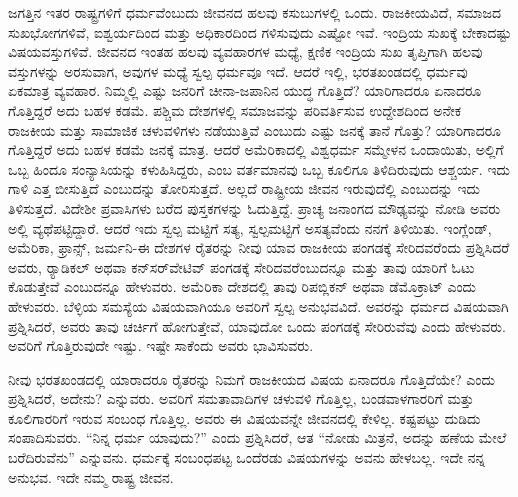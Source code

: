 ಜಗತ್ತಿನ ಇತರ ರಾಷ್ಟ್ರಗಳಿಗೆ ಧರ್ಮವೆಂಬುದು ಜೀವನದ ಹಲವು ಕಸುಬುಗಳಲ್ಲಿ ಒಂದು. ರಾಜಕೀಯವಿದೆ, ಸಮಾಜದ ಸುಖಭೋಗಗಳಿವೆ, ಐಶ್ವರ್ಯದಿಂದ ಮತ್ತು ಅಧಿಕಾರದಿಂದ ಗಳಿಸುವುದು ಎಷ್ಟೋ ಇವೆ. ಇಂದ್ರಿಯ ಸುಖಕ್ಕೆ ಬೇಕಾದಷ್ಟು ವಿಷಯವಸ್ತುಗಳಿವೆ. ಜೀವನದ ಇಂತಹ ಹಲವು ವ್ಯವಹಾರಗಳ ಮಧ್ಯೆ, ಕ್ಷಣಿಕ ಇಂದ್ರಿಯ ಸುಖ ತೃಪ್ತಿಗಾಗಿ ಹಲವು ವಸ್ತುಗಳನ್ನು ಅರಸುವಾಗ, ಅವುಗಳ ಮಧ್ಯೆ ಸ್ವಲ್ಪ ಧರ್ಮವೂ ಇದೆ. ಆದರೆ ಇಲ್ಲಿ, ಭರತಖಂಡದಲ್ಲಿ ಧರ್ಮವು ಏಕಮಾತ್ರ ವ್ಯವಹಾರ. ನಿಮ್ಮಲ್ಲಿ ಎಷ್ಟು ಜನರಿಗೆ ಚೀನಾ-ಜಪಾನಿನ ಯುದ್ಧ ಗೊತ್ತಿದೆ? ಯಾರಿಗಾದರೂ ಏನಾದರೂ ಗೊತ್ತಿದ್ದರೆ ಅದು ಬಹಳ ಕಡಮೆ. ಪಶ್ಚಿಮ ದೇಶಗಳಲ್ಲಿ ಸಮಾಜವನ್ನು ಪರಿವರ್ತಿಸುವ ಉದ್ದೇಶದಿಂದ ಅನೇಕ ರಾಜಕೀಯ ಮತ್ತು ಸಾಮಾಜಿಕ ಚಳುವಳಿಗಳು ನಡೆಯುತ್ತಿವೆ ಎಂಬುದು ಎಷ್ಟು ಜನಕ್ಕೆ ತಾನೆ ಗೊತ್ತು? ಯಾರಿಗಾದರೂ ಗೊತ್ತಿದ್ದರೆ ಅದು ಬಹಳ ಕಡಮೆ ಜನಕ್ಕೆ ಮಾತ್ರ. ಆದರೆ ಅಮೆರಿಕಾದಲ್ಲಿ ವಿಶ್ವಧರ್ಮ ಸಮ್ಮೇಳನ ಒಂದಾಯಿತು, ಅಲ್ಲಿಗೆ ಒಬ್ಬ ಹಿಂದೂ ಸಂನ್ಯಾಸಿಯನ್ನು ಕಳುಹಿಸಿದ್ದರು, ಎಂಬ ವರ್ತಮಾನವು ಒಬ್ಬ ಕೂಲಿಗೂ ತಿಳಿದಿರುವುದು ಆಶ್ಚರ್ಯ. ಇದು ಗಾಳಿ ಎತ್ತ ಬೀಸುತ್ತಿದೆ ಎಂಬುದನ್ನು ತೋರಿಸುತ್ತದೆ. ಅಲ್ಲದೆ ರಾಷ್ಟ್ರೀಯ ಜೀವನ ಇರುವುದೆಲ್ಲಿ ಎಂಬುದನ್ನು ಇದು ತಿಳಿಸುತ್ತದೆ. ವಿದೇಶೀ ಪ್ರವಾಸಿಗಳು ಬರೆದ ಪುಸ್ತಕಗಳನ್ನು ಓದುತ್ತಿದ್ದೆ. ಪ್ರಾಚ್ಯ ಜನಾಂಗದ ಮೌಢ್ಯವನ್ನು ನೋಡಿ ಅವರು ಅಲ್ಲಿ ವ್ಯಥೆಪಟ್ಟಿದ್ದಾರೆ. ಆದರೆ ಇದು ಸ್ವಲ್ಪ ಮಟ್ಟಿಗೆ ಸತ್ಯ, ಸ್ವಲ್ಪಮಟ್ಟಿಗೆ ಅಸತ್ಯವೆಂದು ನನಗೆ ತಿಳಿಯಿತು. ಇಂಗ್ಲೆಂಡ್​, ಅಮೆರಿಕಾ, ಫ್ರಾನ್ಸ್, ಜರ್ಮನಿ-ಈ ದೇಶಗಳ ರೈತರನ್ನು ನೀವು ಯಾವ ರಾಜಕೀಯ ಪಂಗಡಕ್ಕೆ ಸೇರಿದವರೆಂದು ಪ್ರಶ್ನಿಸಿದರೆ ಅವರು, ರ‌್ಯಾಡಿಕಲ್​ ಅಥವಾ ಕನ್​ಸರ್​ವೇಟಿವ್​ ಪಂಗಡಕ್ಕೆ ಸೇರಿದವರೆಂಬುದನ್ನೂ ಮತ್ತು ತಾವು ಯಾರಿಗೆ ಓಟು ಕೊಡುತ್ತೇವೆ ಎಂಬುದನ್ನೂ ಹೇಳುವರು. ಅಮೆರಿಕಾ ದೇಶದಲ್ಲಿ ತಾವು ರಿಪಬ್ಲಿಕನ್​ ಅಥವಾ ಡೆಮೊಕ್ರಾಟ್​ ಎಂದು ಹೇಳುವರು. ಬೆಳ್ಳಿಯ ಸಮಸ್ಯೆಯ ವಿಷಯವಾಗಿಯೂ ಅವರಿಗೆ ಸ್ವಲ್ಪ ಅನುಭವವಿದೆ. ಅವರನ್ನು ಧರ್ಮದ ವಿಷಯವಾಗಿ ಪ್ರಶ್ನಿಸಿದರೆ, ಅವರು ತಾವು ಚರ್ಚಿಗೆ ಹೋಗುತ್ತೇವೆ, ಯಾವುದೋ ಒಂದು ಪಂಗಡಕ್ಕೆ ಸೇರಿರುವೆವು ಎಂದು ಹೇಳುವರು. ಅವರಿಗೆ ಗೊತ್ತಿರುವುದೇ ಇಷ್ಟು. ಇಷ್ಟೇ ಸಾಕೆಂದು ಅವರು ಭಾವಿಸುವರು.

ನೀವು ಭರತಖಂಡದಲ್ಲಿ ಯಾರಾದರೂ ರೈತರನ್ನು ನಿಮಗೆ ರಾಜಕೀಯದ ವಿಷಯ ಏನಾದರೂ ಗೊತ್ತಿದೆಯೇ? ಎಂದು ಪ್ರಶ್ನಿಸಿದರೆ, ಅದೇನು? ಎನ್ನುವರು. ಅವರಿಗೆ ಸಮತಾವಾದಿಗಳ ಚಳುವಳಿ ಗೊತ್ತಿಲ್ಲ, ಬಂಡವಾಳಗಾರರಿಗೆ ಮತ್ತು ಕೂಲಿಗಾರರಿಗೆ ಇರುವ ಸಂಬಂಧ ಗೊತ್ತಿಲ್ಲ. ಅವರು ಈ ವಿಷಯವನ್ನೇ ಜೀವನದಲ್ಲಿ ಕೇಳಿಲ್ಲ. ಕಷ್ಟಪಟ್ಟು ದುಡಿದು ಸಂಪಾದಿಸುವರು. “ನಿನ್ನ ಧರ್ಮ ಯಾವುದು?” ಎಂದು ಪ್ರಶ್ನಿಸಿದರೆ, ಆತ “ನೋಡು ಮಿತ್ರನೆ, ಅದನ್ನು ಹಣೆಯ ಮೇಲೆ ಬರೆದಿರುವೆನು” ಎನ್ನುವನು. ಧರ್ಮಕ್ಕೆ ಸಂಬಂಧಪಟ್ಟ ಒಂದೆರಡು ವಿಷಯಗಳನ್ನು ಅವನು ಹೇಳಬಲ್ಲ. ಇದೇ ನನ್ನ ಅನುಭವ. ಇದೇ ನಮ್ಮ ರಾಷ್ಟ್ರ ಜೀವನ.

